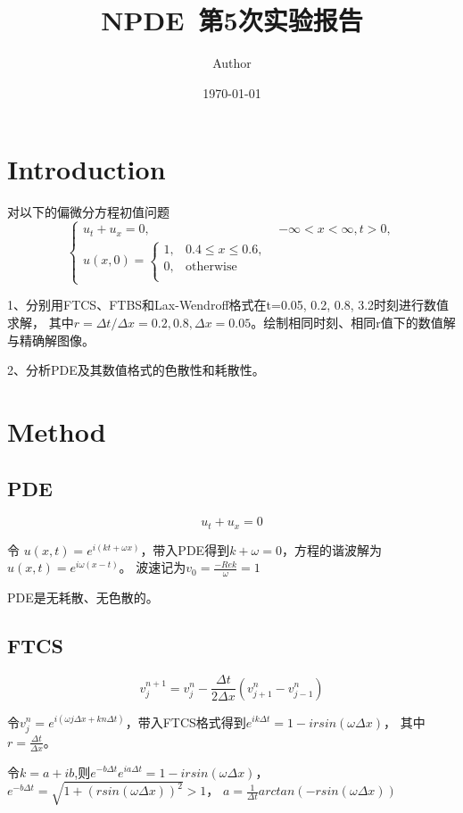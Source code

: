 \documentclass{article}
\title{NPDE~第5次实验报告}
\author{Author}
\date{\today}
\begin{document}
\maketitle

\section{Introduction}

对以下的偏微分方程初值问题
\begin{equation*}
    \begin{cases}
        u_t+u_x=0, & -\infty < x< \infty,t>0,\\
        u(x,0)=\begin{cases}
            1, & 0.4 \leq x \leq 0.6,\\
            0, & \text{otherwise}\\
            \end{cases}
    \end{cases}
\end{equation*}

1、分别用FTCS、FTBS和Lax-Wendroff格式在t=0.05, 0.2, 0.8, 3.2时刻进行数值求解，
其中$r=\Delta t/\Delta x=0.2, 0.8, \Delta x=0.05$。绘制相同时刻、相同r值下的数值解与精确解图像。

2、分析PDE及其数值格式的色散性和耗散性。
\section{Method}
\subsection{PDE}
$$u_t+u_x=0$$

令 $u(x,t)=e^{i(kt+\omega x)}$，带入PDE得到$k+\omega=0$，方程的谐波解为$u(x,t)=e^{i\omega(x- t)}$。
波速记为$v_0=\frac{-Re k}{\omega}=1$

PDE是无耗散、无色散的。
\subsection{FTCS}
$$v_j^{n+1}=v_j^n-\frac{\Delta t}{2\Delta x}(v_{j+1}^n-v_{j-1}^n)$$

令$v_j^n=e^{i(\omega j\Delta x+k n \Delta t)}$，带入FTCS格式得到$e^{ik\Delta t}=1-irsin(\omega \Delta x)$，
其中$r=\frac{\Delta t}{\Delta x}$。

令$k=a+ib$,则$e^{-b\Delta t}e^{ia\Delta t}=1-irsin(\omega \Delta x)$，
$e^{-b\Delta t}=\sqrt{1+(rsin(\omega \Delta x))^2}>1$，
$a=\frac{1}{\Delta t}arctan(-rsin(\omega \Delta x))$
\end{document}
